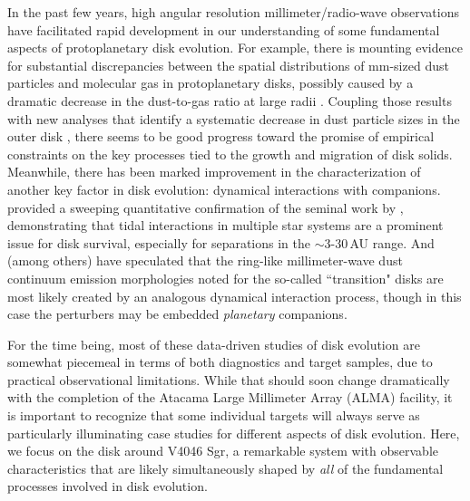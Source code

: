 {In the past few years, high angular resolution millimeter/radio-wave
observations have facilitated rapid development in our understanding of some
fundamental aspects of protoplanetary disk evolution.  For example, there is
mounting evidence for substantial discrepancies between the spatial
distributions of mm-sized dust particles and molecular gas in protoplanetary
disks, possibly caused by a dramatic decrease in the dust-to-gas ratio at large 
radii \citep[e.g.,][]{panic09,andrews12}.  Coupling those results with new 
analyses that identify a systematic decrease in dust particle sizes in the 
outer disk \citep{guilloteau11,perez12}, there seems to be good progress toward 
the promise of empirical constraints on the key processes tied to the growth 
and migration of disk solids.  Meanwhile, there has been marked improvement in 
the characterization of another key factor in disk evolution: dynamical 
interactions with companions.  \citet{harris12} provided a sweeping 
quantitative confirmation of the seminal work by \citet{jensen96}, 
demonstrating that tidal interactions in multiple star systems are a prominent 
issue for disk survival, especially for separations in the $\sim$3-30\,AU 
range.  And \citet{andrews11} (among others) have speculated that the ring-like 
millimeter-wave dust continuum emission morphologies noted for the so-called 
``transition" disks are most likely created by an analogous dynamical 
interaction process, though in this case the perturbers may be embedded {\it 
planetary} companions.

For the time being, most of these data-driven studies of disk evolution are 
somewhat piecemeal in terms of both diagnostics and target samples, due to 
practical observational limitations.  While that should soon change 
dramatically with the completion of the Atacama Large Millimeter Array (ALMA)
facility, it is important to recognize that some individual targets will always
serve as particularly illuminating case studies for different aspects of disk
evolution.  Here, we focus on the disk around V4046 Sgr, a remarkable system
with observable characteristics that are likely simultaneously shaped by {\it 
all} of the fundamental processes involved in disk evolution.

}
